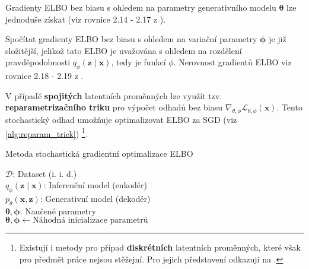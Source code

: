 Gradienty ELBO bez biasu s ohledem na parametry generativního modelu $\boldsymbol{\theta}$ lze jednoduše získat (viz rovnice 2.14 - 2.17 z \cite{Kingma2019}).

Spočítat gradienty ELBO bez biasu s ohledem na variační parametry $\boldsymbol{\phi}$ je již složitější, jelikož tato ELBO je uvažována s ohledem na rozdělení pravděpodobnosti $q_\phi(\textbf{z}\mid\textbf{x})$, tedy je funkcí $\phi$. Nerovnost gradientů ELBO viz rovnice 2.18 - 2.19 z \cite{Kingma2019}.

V případě \textbf{spojitých} latentních proměnných lze využít tzv. \textbf{reparametrizačního triku} pro výpočet odhadů bez biasu $\nabla_{\theta,\phi}\mathcal{L}_{\theta,\phi}(\textbf{x})$.
Tento stochastický odhad umožňuje optimalizovat ELBO za SGD (viz \autoref{alg:reparam_trick})
\footnote{Existují i metody pro případ \textbf{diskrétních} latentních proměnných, které však pro předmět práce nejsou stěžejní. Pro jejich představení odkazuji na \cite[Sekce 2.9.1.]{Kingma2019}.}.

\begin{algorithm}[H]
    \caption{Metoda stochastická gradientní optimalizace ELBO}\label{alg:reparam_trick}
        \KwData{}
                \hspace{6mm}$\mathcal{D}$: Dataset (i. i. d.)\\
                \hspace{6mm}$q_\phi(\textbf{z}\mid\textbf{x})$: Inferenční model (enkodér)\\
                \hspace{6mm}$p_\theta(\textbf{x}, \textbf{z})$: Generativní model (dekodér)\\
        \KwResult{}
        \hspace{6mm}$\boldsymbol{\theta}, \boldsymbol{\phi}$: Naučené parametry\\

        $\boldsymbol{\theta}, \boldsymbol{\phi} \gets \text{Náhodná inicializace parametrů}$

\end{algorithm}


